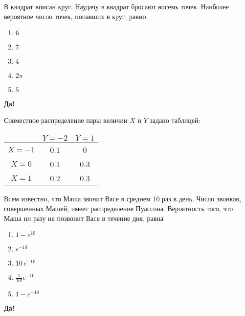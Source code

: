 \documentclass[t]{beamer}
\begin{document}
 \begin{frame} \label{12-Yes} 
\begin{block}{12} 

В квадрат вписан круг. Наудачу в квадрат бросают восемь точек. Наиболее вероятное число точек, попавших в круг, равно
 


 \end{block} 
\begin{enumerate} 
\item[] \hyperlink{12-No}{\beamergotobutton{} $6$
}
\item[] \hyperlink{12-Yes}{\beamergotobutton{} $7$}
\item[] \hyperlink{12-No}{\beamergotobutton{} $4$}
\item[] \hyperlink{12-No}{\beamergotobutton{} $2\pi$}
\item[] \hyperlink{12-No}{\beamergotobutton{} $5$}
\end{enumerate} 

 \textbf{Да!} 
 \hyperlink{13}{}\end{frame} 


 \begin{frame} \label{13-Yes} 
\begin{block}{13} 

Совместное распределение пары величин $X$ и $Y$ задано таблицей:

\begin{center}
\begin{tabular}{c|cc}
 & $Y=-2$ & $Y=1$ \\
\hline
$X=-1$ & 0.1 & 0 \\
$X=0$ & 0.1 & 0.3 \\
$X=1$ & 0.2 & 0.3 \\
\end{tabular}
\end{center}
\vspace{0.2cm} 
 
 Всем известно, что Маша звонит Васе в среднем 10 раз в день. Число звонков, совершенных Машей, имеет распределение Пуассона. Вероятность того, что Маша ни разу не позвонит Васе в течение дня, равна
 


 \end{block} 
\begin{enumerate} 
\item[] \hyperlink{13-No}{\beamergotobutton{} $1 - e^{10}$}
\item[] \hyperlink{13-Yes}{\beamergotobutton{} $e^{-10}$}
\item[] \hyperlink{13-No}{\beamergotobutton{} $10\,e^{-10}$}
\item[] \hyperlink{13-No}{\beamergotobutton{} $\tfrac{1}{10!}e^{-10}$}
\item[] \hyperlink{13-No}{\beamergotobutton{} $1 - e^{-10}$}
\end{enumerate} 

 \textbf{Да!} 
 \hyperlink{14}{}\end{frame} 
\end{document}
